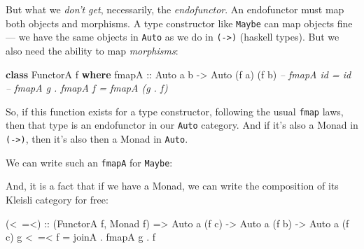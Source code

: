 \documentclass[]{article}
\newenvironment{Shaded}{}{}
\newcommand{\CommentTok}[1]{\textcolor[rgb]{0.38,0.63,0.69}{\textit{#1}}}
\newcommand{\DataTypeTok}[1]{\textcolor[rgb]{0.56,0.13,0.00}{#1}}
\newcommand{\FunctionTok}[1]{\textcolor[rgb]{0.02,0.16,0.49}{#1}}
\newcommand{\KeywordTok}[1]{\textcolor[rgb]{0.00,0.44,0.13}{\textbf{#1}}}
\newcommand{\NormalTok}[1]{#1}
\newcommand{\OtherTok}[1]{\textcolor[rgb]{0.00,0.44,0.13}{#1}}
\begin{document}
But what we \emph{don't get}, necessarily, the \emph{endofunctor}. An
endofunctor must map both objects and morphisms. A type constructor like
\texttt{Maybe} can map objects fine --- we have the same objects in
\texttt{Auto} as we do in \texttt{(-\textgreater{})} (haskell types). But we
also need the ability to map \emph{morphisms}:

\begin{Shaded}
\begin{Highlighting}[]
\KeywordTok{class} \DataTypeTok{FunctorA}\NormalTok{ f }\KeywordTok{where}
\OtherTok{    fmapA ::} \DataTypeTok{Auto}\NormalTok{ a b }\OtherTok{->} \DataTypeTok{Auto}\NormalTok{ (f a) (f b)}
    \CommentTok{-- fmapA id = id}
    \CommentTok{-- fmapA g . fmapA f = fmapA (g . f)}
\end{Highlighting}
\end{Shaded}

So, if this function exists for a type constructor, following the usual
\texttt{fmap} laws, then that type is an endofunctor in our \texttt{Auto}
category. And if it's also a Monad in \texttt{(-\textgreater{})}, then it's also
then a Monad in \texttt{Auto}.

We can write such an \texttt{fmapA} for \texttt{Maybe}:

\begin{Shaded}
\end{Shaded}

And, it is a fact that if we have a Monad, we can write the composition of its
Kleisli category for free:

\begin{Shaded}
\begin{Highlighting}[]
\OtherTok{(<~=<) ::}\NormalTok{ (}\DataTypeTok{FunctorA}\NormalTok{ f, }\DataTypeTok{Monad}\NormalTok{ f) }\OtherTok{=>} \DataTypeTok{Auto}\NormalTok{ a (f c) }\OtherTok{->} \DataTypeTok{Auto}\NormalTok{ a (f b) }\OtherTok{->} \DataTypeTok{Auto}\NormalTok{ a (f c)}
\NormalTok{g }\FunctionTok{<~=<}\NormalTok{ f }\FunctionTok{=}\NormalTok{ joinA }\FunctionTok{.}\NormalTok{ fmapA g }\FunctionTok{.}\NormalTok{ f}
\end{Highlighting}
\end{Shaded}
\end{document}
